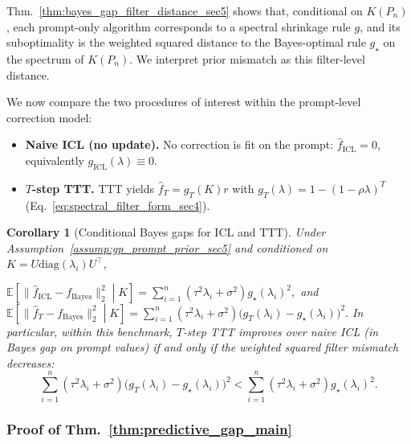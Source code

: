 \documentclass{article}
\theoremstyle{plain}
\newtheorem{corollary}[theorem]{Corollary}
\theoremstyle{definition}
\theoremstyle{remark}
\begin{document}
Thm.~\ref{thm:bayes_gap_filter_distance_sec5} shows that, conditional on $K(P_n)$, each prompt-only algorithm corresponds to a spectral shrinkage rule $g$, and its suboptimality is the weighted squared distance to the Bayes-optimal rule $g_\star$ on the spectrum of $K(P_n)$. We interpret prior mismatch as this filter-level distance.


We now compare the two procedures of interest within the prompt-level correction model:
\begin{itemize}[leftmargin=*, itemsep=1pt, parsep=0pt, topsep=2pt]
\item \textbf{Naive ICL (no update).} No correction is fit on the prompt: $\hat f_{\mathrm{ICL}}=0$,
equivalently $g_{\mathrm{ICL}}(\lambda)\equiv 0$.
\item \textbf{$T$-step TTT.} TTT yields $\hat f_T=g_T(K)r$ with
$g_T(\lambda)=1-(1-\rho\lambda)^T$ (Eq.~\eqref{eq:spectral_filter_form_sec4}).
\end{itemize}


\begin{corollary}[Conditional Bayes gaps for ICL and TTT]
\label{cor:icl_ttt_bayes_gaps_sec5_full}
Under Assumption~\ref{assump:gp_prompt_prior_sec5} and conditioned on $K=U\mathrm{diag}(\lambda_i)U^\top$,

$\mathbb{E}\!\left[\|\hat f_{\mathrm{ICL}}-f_{\mathrm{Bayes}}\|_2^2 \middle| K\right]=
\sum_{i=1}^n (\tau^2\lambda_i+\sigma^2)g_\star(\lambda_i)^2,$ and $
\mathbb{E}\!\left[\|\hat f_T-f_{\mathrm{Bayes}}\|_2^2 \middle| K\right]
=
\sum_{i=1}^n (\tau^2\lambda_i+\sigma^2)\bigl(g_T(\lambda_i)-g_\star(\lambda_i)\bigr)^2.$
In particular, within this benchmark, $T$-step TTT improves over naive ICL (in Bayes gap on prompt values)
if and only if the weighted squared filter mismatch decreases:
\begin{equation}
\sum_{i=1}^n (\tau^2\lambda_i+\sigma^2)\bigl(g_T(\lambda_i)-g_\star(\lambda_i)\bigr)^2
<
\sum_{i=1}^n (\tau^2\lambda_i+\sigma^2)g_\star(\lambda_i)^2.
\end{equation}
\end{corollary}



\subsubsection{Proof of Thm.~\ref{thm:predictive_gap_main}}
\label{app:predictive_gap}
\end{document}
